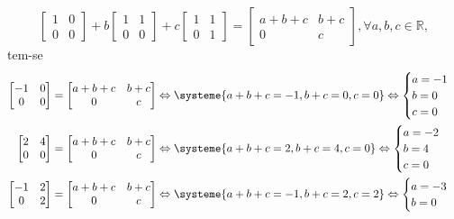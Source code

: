 \documentclass[12pt,a4paper]{article}
\newcommand*\R{\mathbb{R}}
\begin{document}
\begin{ExerciseList}
\begin{enumerate}
\[\begin{bmatrix}
1 & 0\\ 0 & 0
\end{bmatrix}
+ b
\begin{bmatrix}
1 & 1\\ 0 & 0
\end{bmatrix}
+ c
\begin{bmatrix}
1 & 1\\ 0 & 1
\end{bmatrix}
=
\begin{bmatrix}
a+b+c & b+c\\ 0 & c
\end{bmatrix},\forall a,b,c \in \R,
\]
tem-se
\begin{align*}
\begin{bmatrix}
-1 & 0\\ 0 & 0
\end{bmatrix}
& =
\begin{bmatrix}
a+b+c & b+c\\ 0 & c
\end{bmatrix}
\Leftrightarrow
\systeme{
a+b+c=-1,
b+c=0,
c=0
}
\Leftrightarrow
\begin{cases}
a=-1\\
b=0\\
c=0
\end{cases} \\
\begin{bmatrix}
2 & 4\\ 0 & 0
\end{bmatrix}
& =
\begin{bmatrix}
a+b+c & b+c\\ 0 & c
\end{bmatrix}
\Leftrightarrow
\systeme{
a+b+c=2,
b+c=4,
c=0
}
\Leftrightarrow
\begin{cases}
a=-2\\
b=4\\
c=0
\end{cases} \\
\begin{bmatrix}
-1 & 2\\ 0 & 2
\end{bmatrix}
& =
\begin{bmatrix}
a+b+c & b+c\\ 0 & c
\end{bmatrix}
\Leftrightarrow
\systeme{
a+b+c=-1,
b+c=2,
c=2
}
\Leftrightarrow
\begin{cases}
a=-3\\
b=0\\

\end{cases}
\end{align*}
\end{enumerate}
\end{ExerciseList}
\end{document}
